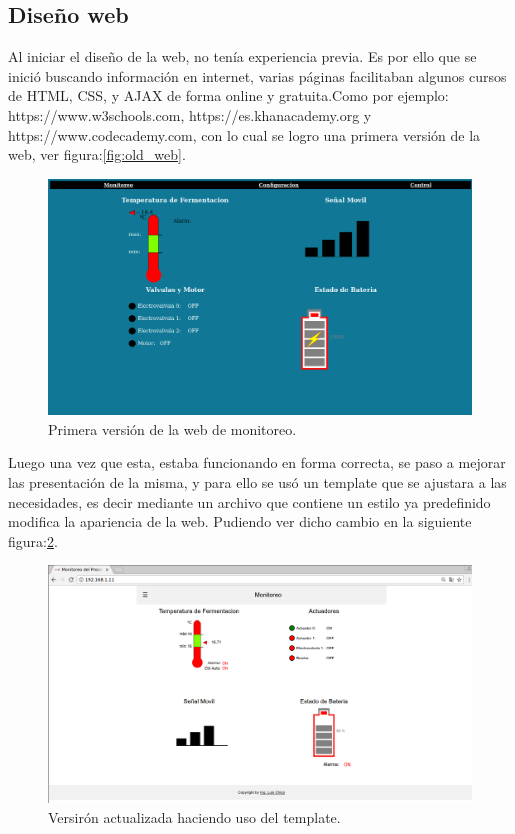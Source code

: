 \subsection*{Diseño web}
Al iniciar el diseño de la web, no tenía experiencia previa. Es por ello que se inició buscando información en internet, varias páginas facilitaban algunos cursos de HTML, CSS, y AJAX  de forma online y gratuita.Como por ejemplo: https://www.w3schools.com, https://es.khanacademy.org y https://www.codecademy.com, con lo cual se logro una primera versión de la web, ver figura:\ref{fig:old_web}.
\begin{figure}[!htb]
    \centering
    \includegraphics[scale=.25]{./Figures/old_web.png}
    \caption{Primera versión de la web de monitoreo.}
    \label{fig:ajax_sec}
\end{figure}

Luego una vez que esta, estaba funcionando en forma correcta, se paso a mejorar las presentación de la misma, y para ello se usó un template que se ajustara a las necesidades, es decir mediante un archivo que contiene un estilo ya predefinido modifica la apariencia de la web. Pudiendo ver dicho cambio en la siguiente figura:\ref{fig:web_monitoreo}.

\begin{figure}[!h]
  \centering
  \includegraphics[scale=.25]{./Figures/web_monitoreo.png}
  \caption{Versirón actualizada haciendo uso del template.}
  \label{fig:web_monitoreo}
\end{figure}

